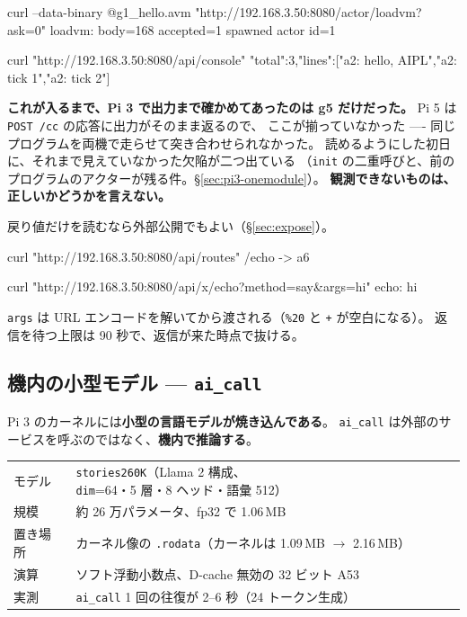 \documentclass[11pt,a4paper]{ltjsarticle}
\begin{document}
\begin{term}
curl --data-binary @g1_hello.avm "http://192.168.3.50:8080/actor/loadvm?ask=0"
loadvm: body=168 accepted=1 spawned actor id=1

curl "http://192.168.3.50:8080/api/console"
{"total":3,"lines":["a2: hello, AIPL","a2: tick 1","a2: tick 2"]}
\end{term}

\textbf{これが入るまで、Pi 3 で出力まで確かめてあったのは g5 だけだった。}
Pi 5 は \texttt{POST /cc} の応答に出力がそのまま返るので、
ここが揃っていなかった ---- 同じプログラムを両機で走らせて突き合わせられなかった。
読めるようにした初日に、それまで見えていなかった欠陥が二つ出ている
（\texttt{init} の二重呼びと、前のプログラムのアクターが残る件。\S\ref{sec:pi3-onemodule}）。
\textbf{観測できないものは、正しいかどうかを言えない。}

戻り値だけを読むなら外部公開でもよい（\S\ref{sec:expose}）。



\begin{term}
curl "http://192.168.3.50:8080/api/routes"
/echo -> a6

curl "http://192.168.3.50:8080/api/x/echo?method=say&args=hi"
echo: hi
\end{term}

\texttt{args} は URL エンコードを解いてから渡される（\texttt{\%20} と \texttt{+} が空白になる）。
返信を待つ上限は 90 秒で、返信が来た時点で抜ける。

\subsection{機内の小型モデル --- \texttt{ai\_call}}
\label{sec:xinu-ai}

Pi 3 のカーネルには\textbf{小型の言語モデルが焼き込んである}。
\texttt{ai\_call} は外部のサービスを呼ぶのではなく、\textbf{機内で推論する}。

\begin{center}
\small
\begin{tabular}{@{}ll@{}}
\toprule
モデル & \texttt{stories260K}（Llama 2 構成、\texttt{dim}=64・5 層・8 ヘッド・語彙 512） \\
規模 & 約 26 万パラメータ、fp32 で 1.06\,MB \\
置き場所 & カーネル像の \texttt{.rodata}（カーネルは 1.09\,MB $\to$ 2.16\,MB） \\
演算 & ソフト浮動小数点、D-cache 無効の 32 ビット A53 \\
実測 & \texttt{ai\_call} 1 回の往復が 2--6 秒（24 トークン生成） \\
\bottomrule
\end{tabular}
\end{center}
\end{document}
